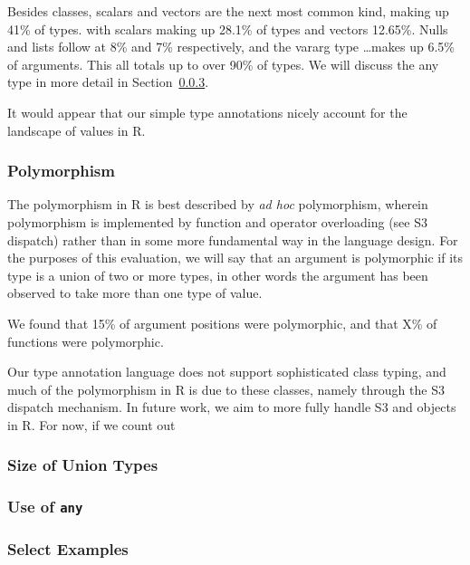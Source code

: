 \documentclass[acmsmall,review,anonymous]{acmart}\settopmatter{printfolios=true,printccs=false,printacmref=false}
\newcommand{\code}[1]{{\lstinline[style=Rin]!#1!}\xspace}
\begin{document}
Besides classes, scalars and vectors are the next most common kind, making up 41\% of types. with scalars making up 28.1\% of types and vectors 12.65\%.
Nulls and lists follow at 8\% and 7\% respectively, and the vararg type \ldots makes up 6.5\% of arguments.
This all totals up to over 90\% of types.
We will discuss the any type in more detail in Section~\ref{subsec:any}.

It would appear that our simple type annotations nicely account for the landscape of values in R.

%
%
\subsubsection{Polymorphism}

The polymorphism in R is best described by {\it ad hoc} polymorphism, wherein polymorphism is implemented by function and operator overloading (see S3 dispatch) rather than in some more fundamental way in the language design.
For the purposes of this evaluation, we will say that an argument is polymorphic if its type is a union of two or more types, in other words the argument has been observed to take more than one type of value.

We found that 15\% of argument positions were polymorphic, and that X\% of functions were polymorphic.

Our type annotation language does not support sophisticated class typing, and much of the polymorphism in R is due to these classes, namely through the S3 dispatch mechanism. 
In future work, we aim to more fully handle S3 and objects in R.
For now, if we count out 

%
%
\subsubsection{Size of Union Types}

%
%
\subsubsection{Use of \code{any}}
\label{subsec:any}

%
%
\subsubsection{Select Examples}
\end{document}

